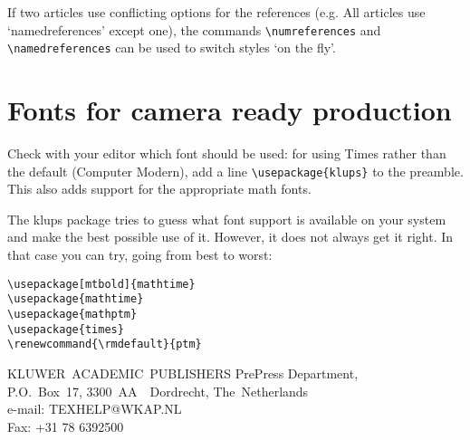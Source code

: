\documentclass[a4paper,namedreferences]{kluwer}
\renewcommand{\rmdefault}{ptm}
\begin{document}
\begin{article}
If two articles use conflicting options for the references
(e.g. All articles use `namedreferences' except one), the commands
\verb"\numreferences" and\break 
\verb"\namedreferences" can be used to 
switch styles `on the fly'.

\section*{Fonts for camera ready production}
                          
Check with your editor which font should be used:
for using Times rather than the default (Computer Modern), add a line
\verb"\usepackage{klups}" to the preamble. This also adds support
for the appropriate math fonts.

The klups package tries to guess what font support is available on
your system and make the best possible use of it. However, it
does not always get it right. In that case you can try, going from
best to worst:
\begin{verbatim}
\usepackage[mtbold]{mathtime}
\usepackage{mathtime}
\usepackage{mathptm}
\usepackage{times}
\renewcommand{\rmdefault}{ptm}
\end{verbatim}
\par\bigskip\bigskip     
KLUWER~ACADEMIC~PUBLISHERS PrePress Department,\\
P.O.~Box~17, 3300~AA~~Dordrecht, The~Netherlands\\
e-mail: TEXHELP@WKAP.NL\\ 
Fax: +31 78 6392500

                                                      
\end{article}                            
\end{document}
